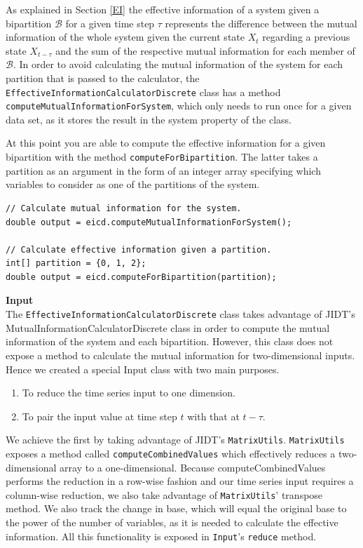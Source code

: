 \documentclass[a4paper,11pt]{article}
\begin{document}
As explained in Section \ref{EI} the effective information of a system given a bipartition $\mathcal{B}$ for a given time step $\tau$ represents the difference between the mutual information of the whole system given the current state $X_t$ regarding a previous state $X_{t-\tau}$ and the sum of the respective mutual information for each member of $\mathcal{B}$. In order to avoid calculating the mutual information of the system for each partition that is passed to the calculator, the \texttt{EffectiveInformationCalculatorDiscrete} class has a method \texttt{computeMutualInformationForSystem}, which only needs to run once for a given data set, as it stores the result in the system property of the class.

At this point you are able to compute the effective information for a given bipartition with the method \texttt{computeForBipartition}. The latter takes a partition as an argument in the form of an integer array specifying which variables to consider as one of the partitions of the system.

\begin{verbatim}
// Calculate mutual information for the system.
double output = eicd.computeMutualInformationForSystem();

// Calculate effective information given a partition.
int[] partition = {0, 1, 2};
double output = eicd.computeForBipartition(partition);
\end{verbatim}

\noindent \textbf{Input}\\

\noindent The \texttt{EffectiveInformationCalculatorDiscrete} class takes advantage of JIDT's MutualInformationCalculatorDiscrete class in order to compute the mutual information of the system and each bipartition. However, this class does not expose a method to calculate the mutual information for two-dimensional inputs. Hence we created a special Input class with two main purposes.

\begin{enumerate}
\item{To reduce the time series input to one dimension.}
\item{To pair the input value at time step $t$ with that at $t-\tau$.}
\end{enumerate}

We achieve the first by taking advantage of JIDT's \texttt{MatrixUtils}. \texttt{MatrixUtils} exposes a method called \texttt{computeCombinedValues} which effectively reduces a two-dimensional array to a one-dimensional. Because computeCombinedValues performs the reduction in a row-wise fashion and our time series input requires a column-wise reduction, we also take advantage of \texttt{MatrixUtils}' transpose method. We also track the change in base, which will equal the original base to the power of the number of variables, as it is needed to calculate the effective information. All this functionality is exposed in \texttt{Input}'s \texttt{reduce} method.
\end{document}
